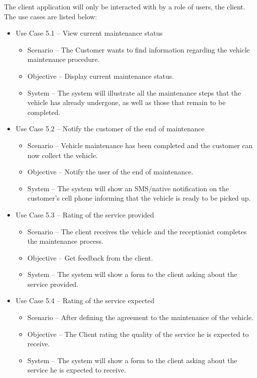 The client application will only be interacted with by a role of users, the client.
The use cases are listed below:

\begin{itemize}
  \item Use Case 5.1 – View current maintenance status
  \begin{itemize}
    \item Scenario – The Customer wants to find information regarding the vehicle maintenance procedure.
    \item Objective – Display current maintenance status.
    \item System – The system will illustrate all the maintenance steps that the vehicle has already undergone, as well as those that remain to be completed. 
  \end{itemize}
  \item Use Case 5.2 – Notify the customer of the end of maintenance 
  \begin{itemize}
    \item Scenario – Vehicle maintenance has been completed and the customer can now collect the vehicle.
    \item Objective – Notify the user of the end of maintenance.
    \item System – The system will show an SMS/native notification on the customer's cell phone informing that the vehicle is ready to be picked up. 
  \end{itemize}
  \item Use Case 5.3 – Rating of the service provided
  \begin{itemize}
    \item Scenario – The client receives the vehicle and the receptionist completes the maintenance process.
    \item Objective – Get feedback from the client.
    \item System – The system will show a form to the client asking about the service provided. 
  \end{itemize}
    \item Use Case 5.4 – Rating of the service expected
  \begin{itemize}
    \item Scenario – After defining the agreement to the maintenance of the vehicle.
    \item Objective – The Client rating the quality of the service he is expected to receive.
    \item System – The system will show a form to the client asking about the service he is expected to receive. 
  \end{itemize}
\end{itemize}
\hfill \break




